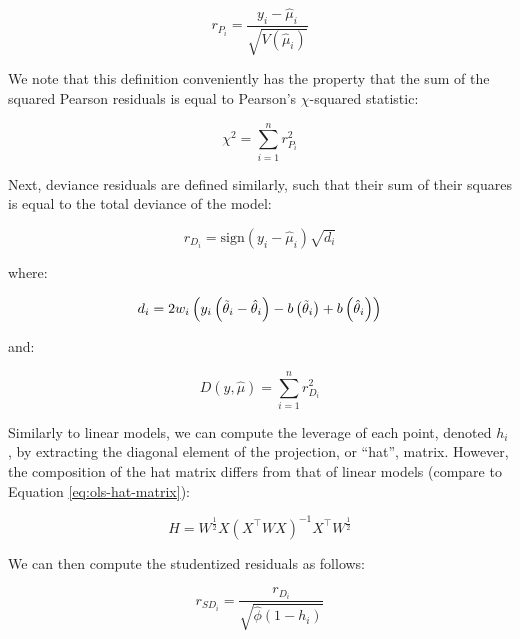 \documentclass{report}
\begin{document}
\begin{equation}\label{eq:glm-resid-pearson-1}
    r_{P_i} = \frac{y_i - \hat{\mu}_i}{\sqrt{V\left(\hat{\mu}_i\right)}}
\end{equation}

We note that this definition conveniently has the property that the sum of the squared Pearson residuals is equal to Pearson's $\chi$-squared statistic:

\begin{equation}\label{eq:glm-resid-pearson-2}
    \chi^2 = \sum_{i=1}^n r_{P_i}^2
\end{equation}

Next, deviance residuals are defined similarly, such that their sum of their squares is equal to the total deviance of the model:

\begin{equation}\label{eq:glm-resid-deviance-1}
    r_{D_i} = \text{sign}(y_i - \hat{\mu}_i)\sqrt{d_i}
\end{equation}

where:

\begin{equation}\label{eq:glm-resid-deviance-2}
    d_i = 2w_i\left(y_i\left(\Tilde{\theta}_i - \hat{\theta}_i\right) - b\left(\Tilde{\theta}_i\right) + b\left(\hat{\theta}_i\right)\right)
\end{equation}

and:

\begin{equation}\label{eq:glm-resid-deviance-3}
    D(y, \hat{\mu}) = \sum_{i=1}^n r_{D_i}^2
\end{equation}

Similarly to linear models, we can compute the leverage of each point, denoted $h_i$, by extracting the diagonal element of the projection, or ``hat'', matrix. However, the composition of the hat matrix differs from that of linear models (compare to Equation \ref{eq:ols-hat-matrix}):

\begin{equation}\label{eq:glm-hat-matrix}
    H = W^{\frac{1}{2}}X\left(X^\intercal WX\right)^{-1}X^\intercal W^{\frac{1}{2}}
\end{equation}

We can then compute the studentized residuals as follows:

\begin{equation}\label{eq:glm-resid-studentized}
    r_{SD_i} = \frac{r_{D_i}}{\sqrt{\hat{\phi}(1 - h_i)}}
\end{equation}
\end{document}
